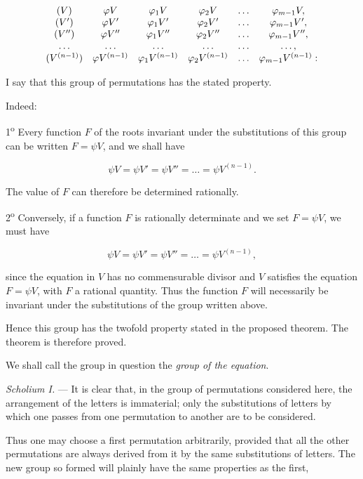\[
\begin{array}{c@{\quad}ccccc}
(V)&\varphi V&\varphi_{1}V&\varphi_{2}V&\ldots&\varphi_{m-1}V,\\
(V')&\varphi V'&\varphi_{1}V'&\varphi_{2}V'&\ldots&\varphi_{m-1}V',\\
(V'')&\varphi V''&\varphi_{1}V''&\varphi_{2}V''&\ldots&\varphi_{m-1}V'',\\
\ldots&\ldots&\ldots&\ldots&\ldots&\ldots,\\
(V^{(n-1)})&\varphi V^{(n-1)}&\varphi_{1}V^{(n-1)}&\varphi_{2}V^{(n-1)}&\ldots&\varphi_{m-1}V^{(n-1)}:
\end{array}
\]

I say that this group of permutations has the stated property.

Indeed:

1\textsuperscript{o} Every function $F$ of the roots invariant under the
substitutions of this group can be written $F=\psi V$, and we shall have

\[
\psi V=\psi V'=\psi V''=\ldots=\psi V^{(n-1)}.
\]

The value of $F$ can therefore be determined rationally.

2\textsuperscript{o} Conversely, if a function $F$ is rationally determinate and
we set $F=\psi V$, we must have

\[
\psi V=\psi V'=\psi V''=\ldots=\psi V^{(n-1)},
\]

since the equation in $V$ has no commensurable divisor and $V$ satisfies the
equation $F=\psi V$, with $F$ a rational quantity. Thus the function $F$ will
necessarily be invariant under the substitutions of the group written above.

Hence this group has the twofold property stated in the proposed theorem. The
theorem is therefore proved.

We shall call the group in question the \emph{group of the equation}.

\emph{Scholium I.} --- It is clear that, in the group of permutations considered
here, the arrangement of the letters is immaterial; only the substitutions of
letters by which one passes from one permutation to another are to be
considered.

Thus one may choose a first permutation arbitrarily, provided that all the
other permutations are always derived from it by the same substitutions of
letters. The new group so formed will plainly have the same properties as the
first,

